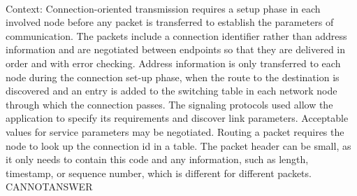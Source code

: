 \documentclass[11pt,a4paper, onecolumn]{article}
\begin{document}
\\ Context: Connection-oriented transmission requires a setup phase in each involved node before any packet is transferred to establish the parameters of communication. The packets include a connection identifier rather than address information and are negotiated between endpoints so that they are delivered in order and with error checking. Address information is only transferred to each node during the connection set-up phase, when the route to the destination is discovered and an entry is added to the switching table in each network node through which the connection passes. The signaling protocols used allow the application to specify its requirements and discover link parameters. Acceptable values for service parameters may be negotiated. Routing a packet requires the node to look up the connection id in a table. The packet header can be small, as it only needs to contain this code and any information, such as length, timestamp, or sequence number, which is different for different packets. CANNOTANSWER
\end{document}
